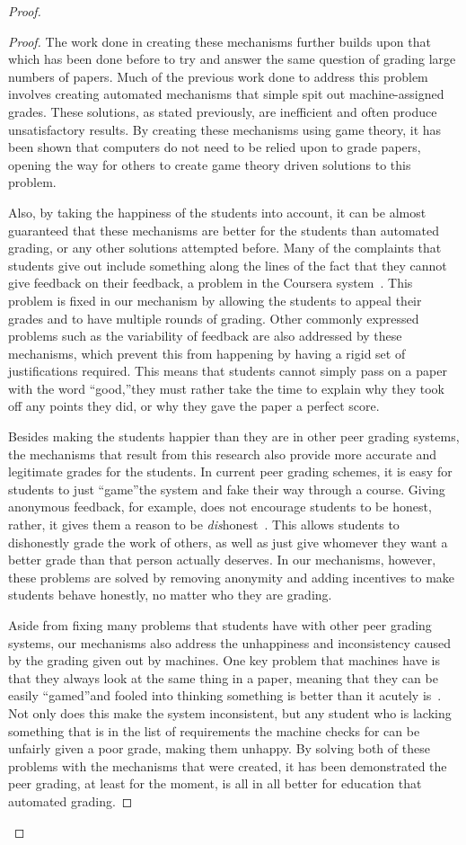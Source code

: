 \documentclass[12pt, Arial]{article}
\begin{document}
\begin{proof}
\begin{proof}
The work done in creating these mechanisms further builds upon that which has been done before to try and answer the same question of grading large numbers of papers. Much of the previous work done to address this problem involves creating automated mechanisms that simple spit out machine-assigned grades. These solutions, as stated previously, are inefficient and often produce unsatisfactory results. By creating these mechanisms using game theory, it has been shown that computers do not need to be relied upon to grade papers, opening the way for others to create game theory driven solutions to this problem.

Also, by taking the happiness of the students into account, it can be almost guaranteed that these mechanisms are better for the students than automated grading, or any other solutions attempted before. Many of the complaints that students give out include something along the lines of the fact that they cannot give feedback on their feedback, a problem in the Coursera system~\cite{howaccurateispeergrading}. This problem is fixed in our mechanism by allowing the students to appeal their grades and to have multiple rounds of grading. Other commonly expressed problems such as the variability of feedback are also addressed by these mechanisms, which prevent this from happening by having a rigid set of justifications required. This means that students cannot simply pass on a paper with the word ``good,''they must rather take the time to explain why they took off any points they did, or why they gave the paper a perfect score.

Besides making the students happier than they are in other peer grading systems, the mechanisms that result from this research also provide more accurate and legitimate grades for the students. In current peer grading schemes, it is easy for students to just ``game''the system and fake their way through a course. Giving anonymous feedback, for example, does not encourage students to be honest, rather, it gives them a reason to be \emph{dis}honest~\cite{howaccurateispeergrading}. This allows students to dishonestly grade the work of others, as well as just give whomever they want a better grade than that person actually deserves. In our mechanisms, however, these problems are solved by removing anonymity and adding incentives to make students behave honestly, no matter who they are grading.

Aside from fixing many problems that students have with other peer grading systems, our mechanisms also address the unhappiness and inconsistency caused by the grading given out by machines. One key problem that machines have is that they always look at the same thing in a paper, meaning that they can be easily ``gamed''and fooled into thinking something is better than it acutely is~\cite{robogradingproblems}. Not only does this make the system inconsistent, but any student who is lacking something that is in the list of requirements the machine checks for can be unfairly given a poor grade, making them unhappy. By solving both of these problems with the mechanisms that were created, it has been demonstrated the peer grading, at least for the moment, is all in all better for education that automated grading.


\end{proof}
\end{proof}
\end{document}
